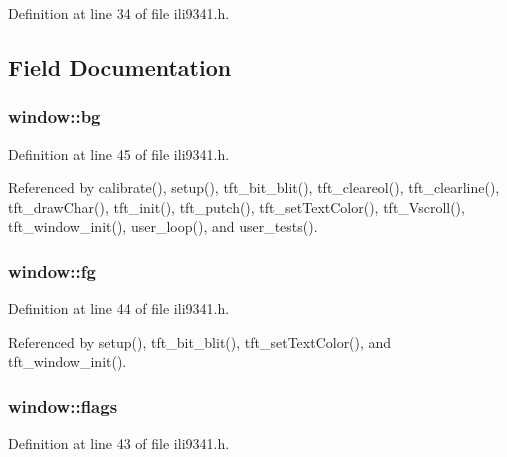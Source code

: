 Definition at line 34 of file ili9341.\+h.



\subsection{Field Documentation}
\subsubsection[{\texorpdfstring{bg}{bg}}]{ window\+::bg}\hypertarget{structwindow_affcf5d29153103c2537542f5a4f8ba87}{}\label{structwindow_affcf5d29153103c2537542f5a4f8ba87}


Definition at line 45 of file ili9341.\+h.



Referenced by calibrate(), setup(), tft\+\_\+bit\+\_\+blit(), tft\+\_\+cleareol(), tft\+\_\+clearline(), tft\+\_\+draw\+Char(), tft\+\_\+init(), tft\+\_\+putch(), tft\+\_\+set\+Text\+Color(), tft\+\_\+\+Vscroll(), tft\+\_\+window\+\_\+init(), user\+\_\+loop(), and user\+\_\+tests().

\subsubsection[{\texorpdfstring{fg}{fg}}]{ window\+::fg}\hypertarget{structwindow_ac8739cdb3c50efcc1deaa5ab955a5e62}{}\label{structwindow_ac8739cdb3c50efcc1deaa5ab955a5e62}


Definition at line 44 of file ili9341.\+h.



Referenced by setup(), tft\+\_\+bit\+\_\+blit(), tft\+\_\+set\+Text\+Color(), and tft\+\_\+window\+\_\+init().

\subsubsection[{\texorpdfstring{flags}{flags}}]{ window\+::flags}\hypertarget{structwindow_ad58fae853f87093ef4f0139df0a3f33d}{}\label{structwindow_ad58fae853f87093ef4f0139df0a3f33d}


Definition at line 43 of file ili9341.\+h.



